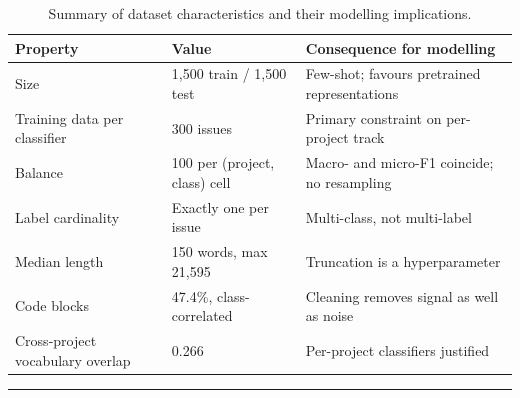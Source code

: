 \begin{table}[ht]
\centering
\caption{Summary of dataset characteristics and their modelling implications.}
\label{tab:dataset_summary}
\vspace{0.5em}
\begin{tabularx}{\linewidth}{@{} l p{4.2cm} X @{}}
\toprule
Property & Value & Consequence for modelling \\
\midrule
Size                             & 1,500 train / 1,500 test      & Few-shot; favours pretrained representations \\
Training data per classifier     & 300 issues                    & Primary constraint on per-project track \\
Balance                          & 100 per (project, class) cell & Macro- and micro-F1 coincide; no resampling \\
Label cardinality                & Exactly one per issue         & Multi-class, not multi-label \\
Median length                    & 150 words, max 21,595         & Truncation is a hyperparameter \\
Code blocks                      & 47.4\%, class-correlated      & Cleaning removes signal as well as noise \\
Cross-project vocabulary overlap & 0.266                         & Per-project classifiers justified \\
\bottomrule
\end{tabularx}
\end{table}


\vspace{1em}
\hrule
\vspace{1em}
